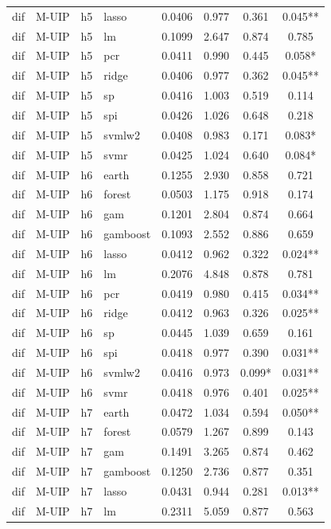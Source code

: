 \begin{ThreePartTable}
\begin{longtable}[t]{llclcccc}
dif & M-UIP & h5 & lasso & 0.0406 & 0.977 & 0.361 & 0.045**\\
dif & M-UIP & h5 & lm & 0.1099 & 2.647 & 0.874 & 0.785\\
dif & M-UIP & h5 & pcr & 0.0411 & 0.990 & 0.445 & 0.058*\\
dif & M-UIP & h5 & ridge & 0.0406 & 0.977 & 0.362 & 0.045**\\
dif & M-UIP & h5 & sp & 0.0416 & 1.003 & 0.519 & 0.114\\
dif & M-UIP & h5 & spi & 0.0426 & 1.026 & 0.648 & 0.218\\
dif & M-UIP & h5 & svmlw2 & 0.0408 & 0.983 & 0.171 & 0.083*\\
dif & M-UIP & h5 & svmr & 0.0425 & 1.024 & 0.640 & 0.084*\\
\addlinespace
dif & M-UIP & h6 & earth & 0.1255 & 2.930 & 0.858 & 0.721\\
dif & M-UIP & h6 & forest & 0.0503 & 1.175 & 0.918 & 0.174\\
dif & M-UIP & h6 & gam & 0.1201 & 2.804 & 0.874 & 0.664\\
dif & M-UIP & h6 & gamboost & 0.1093 & 2.552 & 0.886 & 0.659\\
dif & M-UIP & h6 & lasso & 0.0412 & 0.962 & 0.322 & 0.024**\\
dif & M-UIP & h6 & lm & 0.2076 & 4.848 & 0.878 & 0.781\\
dif & M-UIP & h6 & pcr & 0.0419 & 0.980 & 0.415 & 0.034**\\
dif & M-UIP & h6 & ridge & 0.0412 & 0.963 & 0.326 & 0.025**\\
dif & M-UIP & h6 & sp & 0.0445 & 1.039 & 0.659 & 0.161\\
dif & M-UIP & h6 & spi & 0.0418 & 0.977 & 0.390 & 0.031**\\
dif & M-UIP & h6 & svmlw2 & 0.0416 & 0.973 & 0.099* & 0.031**\\
dif & M-UIP & h6 & svmr & 0.0418 & 0.976 & 0.401 & 0.025**\\
\addlinespace
dif & M-UIP & h7 & earth & 0.0472 & 1.034 & 0.594 & 0.050**\\
dif & M-UIP & h7 & forest & 0.0579 & 1.267 & 0.899 & 0.143\\
dif & M-UIP & h7 & gam & 0.1491 & 3.265 & 0.874 & 0.462\\
dif & M-UIP & h7 & gamboost & 0.1250 & 2.736 & 0.877 & 0.351\\
dif & M-UIP & h7 & lasso & 0.0431 & 0.944 & 0.281 & 0.013**\\
dif & M-UIP & h7 & lm & 0.2311 & 5.059 & 0.877 & 0.563\\

\end{longtable}
\end{ThreePartTable}
